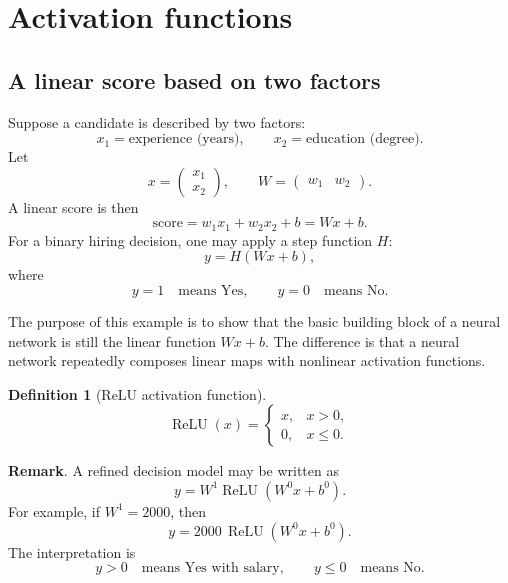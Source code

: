 \documentclass[11pt,a4paper]{article}
\newcommand{\ReLU}{\operatorname{ReLU}}
\theoremstyle{definition}
\newtheorem{definition}{Definition}[section]
\theoremstyle{plain}
\theoremstyle{remark}
\theoremstyle{plain}
\newcommand{\boxnote}[1]{%
  \vspace{0.5em}
  \noindent\colorbox{softblue}{\parbox{0.965\linewidth}{#1}}
  \vspace{0.5em}
}
\begin{document}
\section{Activation functions}

\subsection{A linear score based on two factors}

Suppose a candidate is described by two factors:
\[
  x_1=\text{experience (years)},\qquad x_2=\text{education (degree)}.
\]
Let
\[
  x=\begin{pmatrix}x_1\\x_2\end{pmatrix},
  \qquad
  W=\begin{pmatrix}w_1&w_2\end{pmatrix}.
\]
A linear score is then
\[
  \text{score}=w_1x_1+w_2x_2+b=Wx+b.
\]
For a binary hiring decision, one may apply a step function $H$:
\[
  y=H(Wx+b),
\]
where
\[
  y=1 \quad \text{means Yes},
  \qquad
  y=0 \quad \text{means No}.
\]

\begin{center}
\end{center}

\boxnote{The purpose of this example is to show that the basic building block of a neural network is still the linear function $Wx+b$. The difference is that a neural network repeatedly composes linear maps with nonlinear activation functions.}

\begin{definition}
[ReLU activation function]
\[
  \ReLU(x)=
  \begin{cases}
    x, & x>0,\\
    0, & x\le 0.
  \end{cases}
\]
\end{definition}

\textbf{Remark}. 
A refined decision model may be written as
\[
  y=W^1\ReLU(W^0x+b^0).
\]
For example, if $W^1=2000$, then
\[
  y=2000\,\ReLU(W^0x+b^0).
\]
The interpretation is
\[
  y>0 \quad \text{means Yes with salary},
  \qquad
  y\le 0 \quad \text{means No}.
\]
\end{document}
